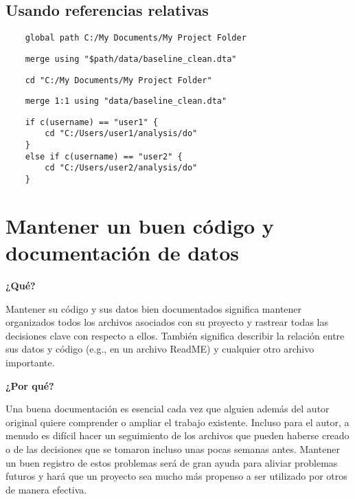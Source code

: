 \documentclass[11pt,en]{elegantpaper}
\begin{document}
\subsection{Usando referencias relativas}
\label{sec:refrelativas}


\begin{lstlisting}
	global path C:/My Documents/My Project Folder
\end{lstlisting}


\begin{lstlisting}
	merge using "$path/data/baseline_clean.dta"
\end{lstlisting}

\begin{lstlisting}
	cd "C:/My Documents/My Project Folder"
\end{lstlisting}

\begin{lstlisting}
	merge 1:1 using "data/baseline_clean.dta"
\end{lstlisting}

\begin{lstlisting}
	if c(username) == "user1" {
		cd "C:/Users/user1/analysis/do"
	}
	else if c(username) == "user2" {
		cd "C:/Users/user2/analysis/do"
	}
\end{lstlisting}


\newpage 
\section{Mantener un buen código y documentación de datos}
\label{sec:documentacion}
\noindent
\textbf{¿Qué?}

Mantener su código y sus datos bien documentados significa mantener organizados todos los archivos asociados con su proyecto y rastrear todas las decisiones clave con respecto a ellos. También significa describir la relación entre sus datos y código (e.g., en un archivo ReadME) y cualquier otro archivo importante.

\noindent
\textbf{¿Por qué?}

Una buena documentación es esencial cada vez que alguien además del autor original quiere comprender o ampliar el trabajo existente. Incluso para el autor, a menudo es difícil hacer un seguimiento de los archivos que pueden haberse creado o de las decisiones que se tomaron incluso unas pocas semanas antes. Mantener un buen registro de estos problemas será de gran ayuda para aliviar problemas futuros y hará que un proyecto sea mucho más propenso a ser utilizado por otros de manera efectiva.
\end{document}
